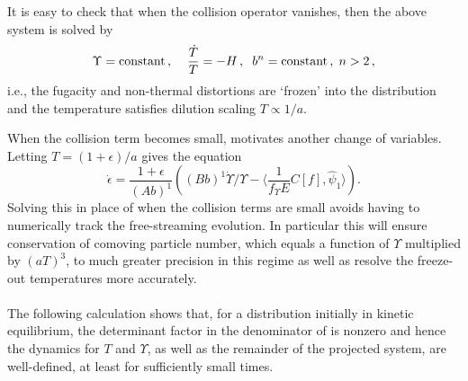It is easy to check that when the collision operator vanishes, then the above system is solved by 
\begin{equation}\label{free_stream_sol}
\Upsilon=\text{constant}\,,\hspace{4mm} \frac{\dot T}{T}=-H\,,\hspace{2mm}  b^n=\text{constant}\,,\hspace{1mm} n>2\,,
\end{equation}
i.e., the fugacity and non-thermal distortions are `frozen' into the distribution and the temperature satisfies dilution scaling $T\propto 1/a$.

When the collision term becomes small,  motivates another change of variables. Letting $T=(1+\epsilon)/a$  gives the equation
\begin{equation}
\dot\epsilon=\frac{1+\epsilon}{(Ab)^1}\left((Bb)^1\dot{\Upsilon}/\Upsilon-\langle\frac{1}{f_\Upsilon E}C[f],\hat\psi_1\rangle\right).
\end{equation}
Solving this in place of  when the collision terms are small avoids having to numerically track the free-streaming evolution.  In particular this will ensure conservation of comoving particle number, which equals a function of $\Upsilon$ multiplied by $(aT)^3$, to much greater precision in this regime as well as resolve the freeze-out temperatures more accurately.\\

\\
The following calculation shows that, for a distribution initially in kinetic equilibrium, the determinant factor in the denominator of  is nonzero and hence the dynamics for $T$ and $\Upsilon$, as well as the remainder of the projected system, are well-defined, at least for sufficiently small times. 

